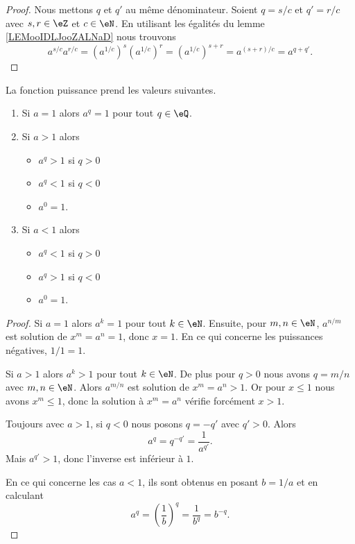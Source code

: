 \begin{proof}
    Nous mettons \( q\) et \( q'\) au même dénominateur. Soient \( q=s/c\) et \( q'=r/c\) avec \( s,r\in \eZ\) et \( c\in \eN\). En utilisant les égalités du lemme \ref{LEMooIDLJooZALNaD} nous trouvons
    \begin{equation}
        a^{s/c}a^{r/c}=(a^{1/c})^s(a^{1/c})^r=(a^{1/c})^{s+r}=a^{(s+r)/c}=a^{q+q'}.
    \end{equation}
\end{proof}

\begin{lemma}        \label{LEMooXJXUooLoiTMo}
    La fonction puissance prend les valeurs suivantes.
    \begin{enumerate}
        \item
            Si \( a=1\) alors \( a^q=1\) pour tout \( q\in \eQ\).
        \item       \label{ITEMooKZCGooKskUQx}
            Si \( a>1\) alors 
            \begin{itemize}
                \item \( a^q>1\) si \( q>0\)
                \item \( a^q<1\) si \( q<0\)
                \item \( a^0=1\).
            \end{itemize}
        \item
            Si \( a<1\) alors 
            \begin{itemize}
                \item \( a^q<1\) si \( q>0\)
                \item \( a^q>1\) si \( q<0\)
                \item \( a^0=1\).
            \end{itemize}
    \end{enumerate}
\end{lemma}

\begin{proof}
    Si \( a=1\) alors \( a^k=1\) pour tout \( k\in \eN\). Ensuite, pour \( m,n\in \eN\), \( a^{n/m}\) est solution de \( x^m=a^n=1\), donc \( x=1\). En ce qui concerne les puissances négatives, \( 1/1=1\).

    Si \( a>1\) alors \( a^k>1\) pour tout \( k\in \eN\). De plus pour \( q>0\) nous avons \( q=m/n\) avec \( m,n\in \eN\). Alors \( a^{m/n}\) est solution de \( x^m=a^n>1\). Or pour \( x\leq 1\) nous avons \( x^m\leq 1\), donc la solution à \( x^m=a^n\) vérifie forcément \( x>1\).

    Toujours avec \( a>1\), si \( q<0\) nous posons \( q=-q'\) avec \( q'>0\). Alors
    \begin{equation}
        a^q=q^{-q'}=\frac{1}{ a^{q'} }.
    \end{equation}
    Mais \( a^{q'}>1\), donc l'inverse est inférieur à \( 1\).

    En ce qui concerne les cas \( a<1\), ils sont obtenus en posant \( b=1/a\) et en calculant
    \begin{equation}
        a^q=\left( \frac{1}{ b } \right)^q=\frac{1}{ b^q }=b^{-q}.
    \end{equation}
\end{proof}


